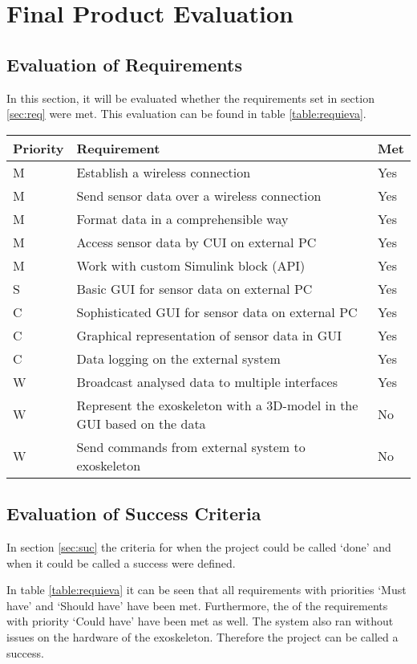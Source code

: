 \chapter{Final Product Evaluation}
\label{ch:eval}
\section{Evaluation of Requirements}
In this section, it will be evaluated whether the requirements set in section \ref{sec:req} were met. This evaluation can be found in table \ref{table:requieva}.\\

{\renewcommand{\arraystretch}{1.5}
	\centering
	\begin{tabular}{ | l | l || l || }
		\hline
		\bfseries{Priority} & \bfseries{Requirement} & \bfseries{Met} \\ \hline
		M & Establish a wireless connection & Yes \\ \hline
		M & Send sensor data over a wireless connection & Yes \\ \hline
		M & Format data in a comprehensible way & Yes \\ \hline
		M & Access sensor data by CUI on external PC & Yes \\ \hline
		M & Work with custom Simulink block (API) & Yes \\ \hline
		S & Basic GUI for sensor data on external PC & Yes \\ \hline
		C & Sophisticated GUI for sensor data on external PC & Yes \\ \hline
		C & Graphical representation of sensor data in GUI & Yes \\ \hline
		C & Data logging on the external system & Yes \\ \hline
		W & Broadcast analysed data to multiple interfaces & Yes \\ \hline
		W & Represent the exoskeleton with a 3D-model in the GUI based on the data & No \\ \hline
		W & Send commands from external system to exoskeleton & No \\ \hline 
	\end{tabular}
	\label{table:requieva}
}

\section{Evaluation of Success Criteria} \label{sec:evasuc}
In section \ref{sec:suc} the criteria for when the project could be called `done' and when it could be called a success were defined.

In table \ref{table:requieva} it can be seen that all requirements with priorities `Must have' and `Should have' have been met. Furthermore, the  of the requirements with priority `Could have' have been met as well. The system also ran without issues on the hardware of the exoskeleton. Therefore the project can be called a success.
